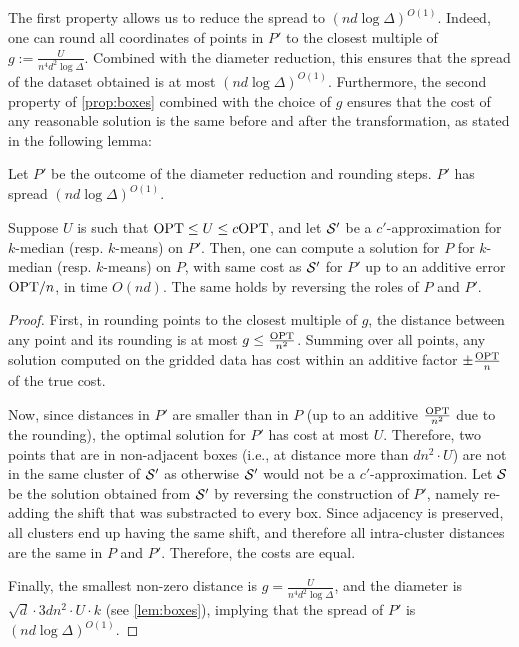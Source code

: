 The first property allows us to reduce the spread to $(nd \log \Delta)^{O(1)}$.  Indeed, one can round all coordinates of points in $P'$ to the closest multiple of
$g := \frac{U}{n^4 d^{2} \log \Delta}$.
Combined with the diameter reduction, this ensures that the spread of the dataset obtained is at most $(nd \log \Delta)^{O(1)}$. 
Furthermore, the second property of \cref{prop:boxes} combined with the choice of $g$ ensures that the cost of any reasonable solution is the same before and after the transformation, as stated in the following lemma:

\begin{lemma}\label{lem:reduceSpread}
Let $P'$ be the outcome of the diameter reduction and rounding steps. $P'$ has spread $(nd \log \Delta)^{O(1)}$.

Suppose $U$ is such that $\text{OPT} \leq U \leq c \text{OPT}$, and 
let $\mathcal S'$ be a $c'$-approximation for  $k$-median (resp. $k$-means) on $P'$. 
Then, one can compute a solution for $P$ for $k$-median (resp. $k$-means) on $P$, with same cost as $\mathcal S'$ for $P'$ up to an additive error $\text{OPT} / n$, in time $O(nd)$. The same holds by reversing the roles of $P$ and $P'$.
\end{lemma}
\begin{proof}
First, in rounding points to the closest multiple of $g$,
  the distance between any point and its rounding is at most $g \leq \frac{\text{OPT}}{n^2}$. Summing over all points,
any solution computed on the gridded data has cost within an additive factor $\pm \frac{\text{OPT}}{n}$ of the true cost. 

Now, since distances in $P'$ are smaller than in $P$ (up to an additive $\frac{\text{OPT}}{n^2}$ due to the rounding), the optimal solution for $P'$ has cost at most $U$. Therefore, two points that are in non-adjacent boxes
(i.e., at distance more than $d n^2\cdot U$) are not in the same cluster of $\mathcal S'$ as otherwise $\mathcal S'$ would not be a $c'$-approximation. 
 Let $\mathcal S$ be
the solution obtained from $\mathcal S'$ by reversing the construction of $P'$, namely re-adding the shift that was substracted to every box. Since adjacency is preserved, all clusters end up having the same shift, and therefore all
intra-cluster distances are the same in $P$ and $P'$. Therefore, the costs are equal.

Finally, the smallest
non-zero distance is $g = \frac{U}{n^4 d^{2} \log \Delta}$, and the diameter is $\sqrt{d} \cdot 3d n^2\cdot U \cdot k$ (see \cref{lem:boxes}), implying that the spread of $P'$ is $(nd \log \Delta)^{O(1)}$.
\end{proof}



